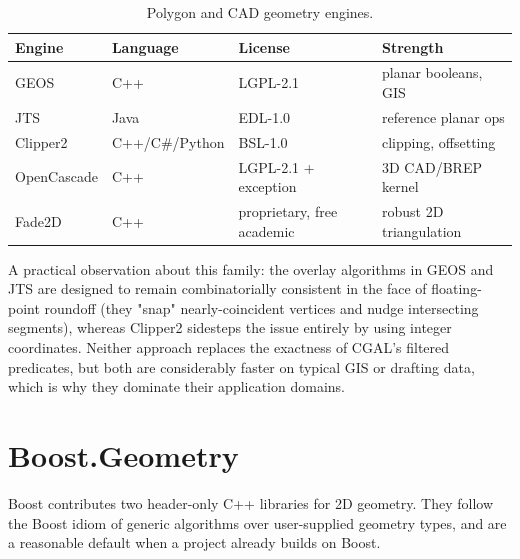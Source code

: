 \begin{table}[ht]
\centering
\begin{tabular}{llll}
\hline
\textbf{Engine} & \textbf{Language} & \textbf{License} & \textbf{Strength} \\
\hline
GEOS            & C++        & LGPL-2.1             & planar booleans, GIS \\
JTS             & Java       & EDL-1.0              & reference planar ops \\
Clipper2        & C++/C\#/Python & BSL-1.0           & clipping, offsetting \\
OpenCascade     & C++        & LGPL-2.1 + exception & 3D CAD/BREP kernel \\
Fade2D          & C++        & proprietary, free academic & robust 2D triangulation \\
\hline
\end{tabular}
\caption{Polygon and CAD geometry engines.}
\label{tbl:appsoft_geose}
\end{table}

A practical observation about this family: the overlay algorithms in
GEOS and JTS are designed to remain combinatorially consistent in the
face of floating-point roundoff (they "snap" nearly-coincident vertices
and nudge intersecting segments), whereas Clipper2 sidesteps the issue
entirely by using integer coordinates. Neither approach replaces the
exactness of CGAL's filtered predicates, but both are considerably faster
on typical GIS or drafting data, which is why they dominate their
application domains.

\section{Boost.Geometry}
\label{sec:app_soft_boost}

Boost contributes two header-only C++ libraries for 2D geometry. They
follow the Boost idiom of generic algorithms over user-supplied geometry
types, and are a reasonable default when a project already builds on
Boost.

